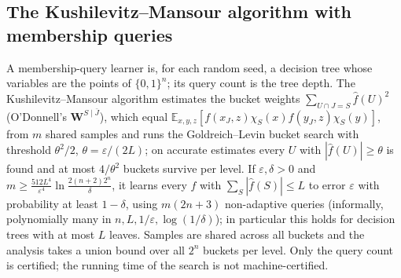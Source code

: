 \begin{result}
\subsection{The Kushilevitz--Mansour algorithm with membership queries}
A membership-query learner is, for each random seed, a decision tree whose variables are the
points of $\{0,1\}^n$; its query count is the tree depth. The Kushilevitz--Mansour algorithm
estimates the bucket weights $\sum_{U\cap J=S}\hat f(U)^2$ (O'Donnell's $\mathbf W^{S\mid\bar J}$),
which equal $\mathbb E_{x,y,z}[f(x_J,z)\chi_S(x)f(y_J,z)\chi_S(y)]$, from $m$ shared samples and
runs the Goldreich--Levin bucket search with threshold $\theta^2/2$, $\theta=\varepsilon/(2L)$; on
accurate estimates every $U$ with $|\hat f(U)|\ge\theta$ is found and at most $4/\theta^2$ buckets
survive per level. If $\varepsilon,\delta>0$ and
$m\ge\frac{512L^4}{\varepsilon^4}\ln\frac{2(n+2)2^n}{\delta}$, it learns every $f$ with
$\sum_S|\hat f(S)|\le L$ to error $\varepsilon$ with probability at least $1-\delta$, using
$m(2n+3)$ non-adaptive queries (informally, polynomially many in $n,L,1/\varepsilon,\log(1/\delta)$);
in particular this holds for decision trees with at most $L$ leaves. Samples are shared across all
buckets and the analysis takes a union bound over all $2^n$ buckets per level. Only the query
count is certified; the running time of the search is not machine-certified.
\citep{KushilevitzMansour1993,GoldreichLevin1989,ODonnell2014,Angluin1988}
\end{result}


